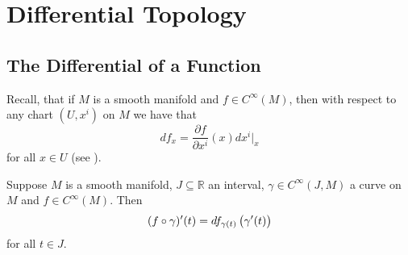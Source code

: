 \chapter{Differential Topology}
\section*{The Differential of a Function}
Recall, that if $M$ is a smooth manifold and $f \in C^\infty(M)$, then with respect to any chart $(U,x^i)$ on $M$ we have that
\begin{equation}
	\label{eq:differential_of_a_function}
	df_x = \frac{\partial f}{\partial x^i}(x)dx^i\vert_x
\end{equation}
\noindent for all $x \in U$ (see \cite[281]{lee:smooth_manifolds:2013}).

\begin{proposition}
	\label{prop:derivative_of_a_function_along_a_curve}
	Suppose $M$ is a smooth manifold, $J \subseteq \mathbb{R}$ an interval, $\gamma \in C^\infty(J,M)$ a curve on $M$ and $f \in C^\infty(M)$. Then
	\begin{equation*}
		(f \circ \gamma)'(t) = df_{\gamma(t)}\del[1]{\gamma'(t)}
	\end{equation*}
	\noindent for all $t \in J$.
\end{proposition}


